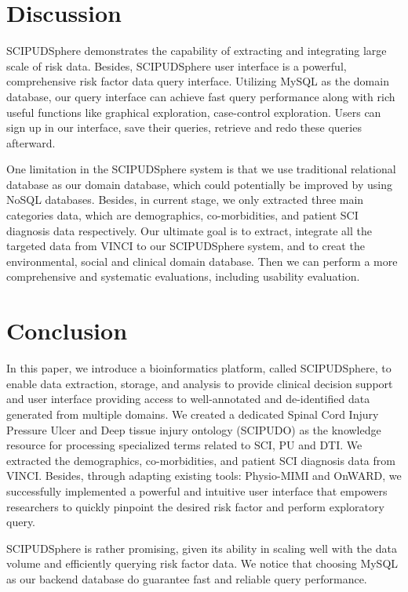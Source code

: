 \documentclass{amia}
\begin{document}
\section{Discussion}
SCIPUDSphere demonstrates the capability of extracting and integrating large scale of risk data. Besides, SCIPUDSphere user interface is a powerful, comprehensive risk factor data query interface. Utilizing MySQL as the domain database, our query interface can achieve fast query performance along with rich useful functions like graphical exploration, case-control exploration. Users can sign up in our interface, save their queries, retrieve and redo these queries afterward. 

One limitation in the SCIPUDSphere system is that we use traditional relational database as our domain database, which could potentially be improved by using NoSQL databases. Besides, in current stage, we only extracted three main categories data, which are demographics, co-morbidities, and patient SCI diagnosis data respectively. Our ultimate goal is to extract, integrate all the targeted data from VINCI to our SCIPUDSphere system, and to creat the environmental, social and clinical domain database. Then we can perform a more comprehensive and systematic evaluations, including usability evaluation. 

\section{Conclusion}
In this paper, we introduce a bioinformatics platform, called SCIPUDSphere, to enable data extraction, storage, and analysis to provide clinical decision support and user interface providing access to well-annotated and de-identified data generated from multiple domains. We created a dedicated Spinal Cord Injury Pressure Ulcer and Deep tissue injury ontology (SCIPUDO) as the knowledge resource for processing specialized terms related to SCI, PU and DTI. We extracted the demographics, co-morbidities, and patient SCI diagnosis data from VINCI. Besides, through adapting existing tools: Physio-MIMI and OnWARD, we successfully implemented a powerful and intuitive user interface that empowers researchers to quickly pinpoint the desired risk factor and perform exploratory query.

SCIPUDSphere is rather promising, given its ability in scaling well with the data volume and efficiently querying risk factor data. We notice that choosing MySQL as our backend database do guarantee fast and reliable query performance.
\end{document}
